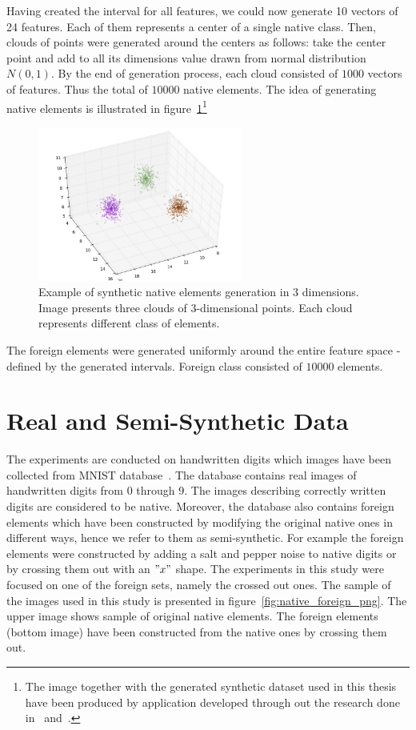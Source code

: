 \documentclass{mini}
\begin{document}
Having created the interval for all features, we could now generate 10 vectors of 24 features. Each of them represents a center of a single native class. Then, clouds of points were generated around the centers as follows: take the center point and add to all its dimensions value drawn from normal distribution $N(0,1)$. 
By the end of generation process, each cloud consisted of $1000$ vectors of features. Thus the total of $10000$ native elements. The idea of generating native elements is illustrated in figure~\ref{fig:synthetic_clouds}\footnote{The image together with the generated synthetic dataset used in this thesis have been produced by application developed through out the research done in~\cite{rejector_geo} and~\cite{rejector_clusters}.}



\begin{figure}[H]
    \includegraphics[width=0.6\textwidth]{./images/native_3clouds.png}
    \caption{Example of synthetic native elements generation in 3 dimensions. Image presents three clouds of 3-dimensional points. Each cloud represents different class of elements. }
    \label{fig:synthetic_clouds}
\end{figure}

The foreign elements were generated uniformly around the entire feature space - defined by the generated intervals. Foreign class consisted of $10000$ elements.

\section{Real and Semi-Synthetic Data}

The experiments are conducted on handwritten digits which images have been collected from MNIST database~\cite{digits_db}. The database contains real images of handwritten digits from 0 through 9. The images describing correctly written digits are considered to be native. Moreover, the database also contains foreign elements which have been constructed by modifying the original native ones in different ways, hence we refer to them as semi-synthetic. For example the foreign elements were constructed by adding a salt and pepper noise to native digits or by crossing them out with an $"x"$ shape. The experiments in this study were focused on one of the foreign sets, namely the crossed out ones. The sample of the images used in this study is presented in figure~\ref{fig:native_foreign_png}. The upper image shows sample of original native elements. The foreign elements (bottom image) have been constructed from the native ones by crossing them out.
\end{document}

